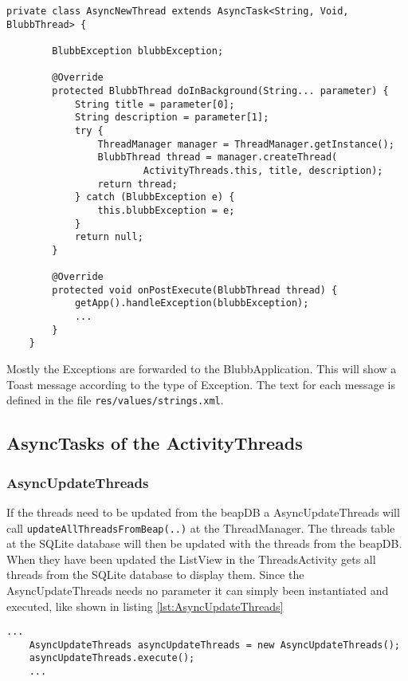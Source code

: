 \documentclass[12pt,a4paper,oneside]{report}
\newcommand{\beapDB}{beapDB}
\newcommand{\code}[1]{\lstinline{#1}}
\begin{document}
\begin{lstlisting}[caption=Exception handling in AsyncTasks, label=lst:Exception]
private class AsyncNewThread extends AsyncTask<String, Void, BlubbThread> {
        
        BlubbException blubbException;

        @Override
        protected BlubbThread doInBackground(String... parameter) {
            String title = parameter[0];
            String description = parameter[1];
            try {
            	ThreadManager manager = ThreadManager.getInstance();
            	BlubbThread thread = manager.createThread(
                        ActivityThreads.this, title, description);
                return thread;
            } catch (BlubbException e) {
                this.blubbException = e;
            }
            return null;
        }
        
        @Override
        protected void onPostExecute(BlubbThread thread) {
            getApp().handleException(blubbException);
        	...
        }
	}
\end{lstlisting}

Mostly the Exceptions are forwarded to the BlubbApplication. This will show a Toast message according to the type of Exception. The text for each message is defined in the file \code{res/values/strings.xml}.

\subsection{AsyncTasks of the ActivityThreads}

\subsubsection{AsyncUpdateThreads}
\label{AsyncUpdateThreads}

If the threads need to be updated from the \beapDB{} a AsyncUpdateThreads will call \code{updateAllThreadsFromBeap(..)} at the ThreadManager. The threads table at the SQLite database will then be updated with the threads from the beapDB. When they have been updated the ListView in the ThreadsActivity gets all threads from the SQLite database to display them.
Since the AsyncUpdateThreads needs no parameter it can simply been instantiated and executed, like shown in listing \ref{lst:AsyncUpdateThreads}

\begin{lstlisting}[caption=AsyncUpdateThreads, label=lst:AsyncUpdateThreads]
	...
	AsyncUpdateThreads asyncUpdateThreads = new AsyncUpdateThreads();
	asyncUpdateThreads.execute();
	...
\end{lstlisting}
\end{document}
